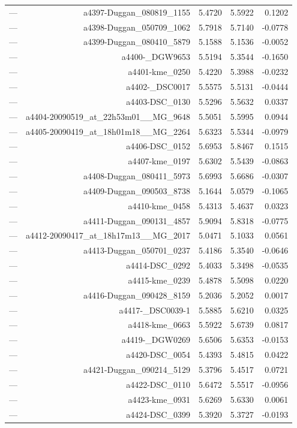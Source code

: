 \begin{table}[htbp]
\begin{tabular}{lrrrr}
— & a4397-Duggan_080819_1155 & 5.4720 & 5.5922 & 0.1202 \\
— & a4398-Duggan_050709_1062 & 5.7918 & 5.7140 & -0.0778 \\
— & a4399-Duggan_080410_5879 & 5.1588 & 5.1536 & -0.0052 \\
— & a4400-_DGW9653 & 5.5194 & 5.3544 & -0.1650 \\
— & a4401-kme_0250 & 5.4220 & 5.3988 & -0.0232 \\
— & a4402-_DSC0017 & 5.5575 & 5.5131 & -0.0444 \\
— & a4403-DSC_0130 & 5.5296 & 5.5632 & 0.0337 \\
— & a4404-20090519_at_22h53m01__MG_9648 & 5.5051 & 5.5995 & 0.0944 \\
— & a4405-20090419_at_18h01m18__MG_2264 & 5.6323 & 5.5344 & -0.0979 \\
— & a4406-DSC_0152 & 5.6953 & 5.8467 & 0.1515 \\
— & a4407-kme_0197 & 5.6302 & 5.5439 & -0.0863 \\
— & a4408-Duggan_080411_5973 & 5.6993 & 5.6686 & -0.0307 \\
— & a4409-Duggan_090503_8738 & 5.1644 & 5.0579 & -0.1065 \\
— & a4410-kme_0458 & 5.4313 & 5.4637 & 0.0323 \\
— & a4411-Duggan_090131_4857 & 5.9094 & 5.8318 & -0.0775 \\
— & a4412-20090417_at_18h17m13__MG_2017 & 5.0471 & 5.1033 & 0.0561 \\
— & a4413-Duggan_050701_0237 & 5.4186 & 5.3540 & -0.0646 \\
— & a4414-DSC_0292 & 5.4033 & 5.3498 & -0.0535 \\
— & a4415-kme_0239 & 5.4878 & 5.5098 & 0.0220 \\
— & a4416-Duggan_090428_8159 & 5.2036 & 5.2052 & 0.0017 \\
— & a4417-_DSC0039-1 & 5.5885 & 5.6210 & 0.0325 \\
— & a4418-kme_0663 & 5.5922 & 5.6739 & 0.0817 \\
— & a4419-_DGW0269 & 5.6506 & 5.6353 & -0.0153 \\
— & a4420-DSC_0054 & 5.4393 & 5.4815 & 0.0422 \\
— & a4421-Duggan_090214_5129 & 5.3796 & 5.4517 & 0.0721 \\
— & a4422-DSC_0110 & 5.6472 & 5.5517 & -0.0956 \\
— & a4423-kme_0931 & 5.6269 & 5.6330 & 0.0061 \\
— & a4424-DSC_0399 & 5.3920 & 5.3727 & -0.0193 \\

\end{tabular}
\end{table}
